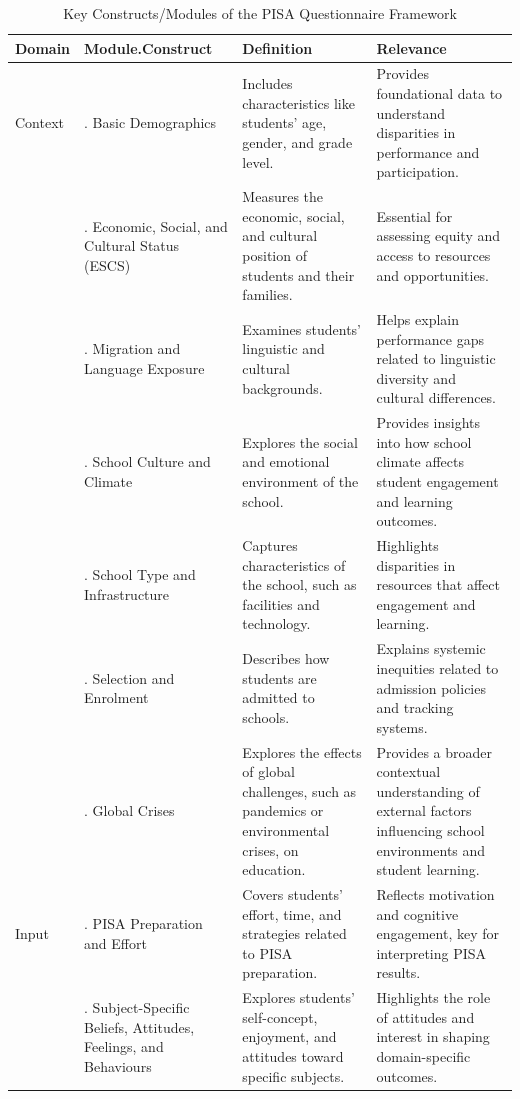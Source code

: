 \documentclass[
]{article}
\begin{document}
\begin{longtable}[l]{>{\raggedright\arraybackslash}p{1.5cm}>{\raggedright\arraybackslash}p{3.5cm}>{\raggedright\arraybackslash}p{5cm}>{\raggedright\arraybackslash}p{5cm}}
\caption{\label{tab:pisa_questionnaire_framework}Key Constructs/Modules of the PISA Questionnaire Framework}\\
\toprule
Domain & Module.Construct & Definition & Relevance\\
\midrule
Context & 1. Basic Demographics & Includes characteristics like students' age, gender, and grade level. & Provides foundational data to understand disparities in performance and participation.\\
 & 2. Economic, Social, and Cultural Status (ESCS) & Measures the economic, social, and cultural position of students and their families. & Essential for assessing equity and access to resources and opportunities.\\
 & 4. Migration and Language Exposure & Examines students' linguistic and cultural backgrounds. & Helps explain performance gaps related to linguistic diversity and cultural differences.\\
 & 6. School Culture and Climate & Explores the social and emotional environment of the school. & Provides insights into how school climate affects student engagement and learning outcomes.\\
 & 11. School Type and Infrastructure & Captures characteristics of the school, such as facilities and technology. & Highlights disparities in resources that affect engagement and learning.\\
\addlinespace
 & 12. Selection and Enrolment & Describes how students are admitted to schools. & Explains systemic inequities related to admission policies and tracking systems.\\
 & 21. Global Crises & Explores the effects of global challenges, such as pandemics or environmental crises, on education. & Provides a broader contextual understanding of external factors influencing school environments and student learning.\\
Input & 5. PISA Preparation and Effort & Covers students’ effort, time, and strategies related to PISA preparation. & Reflects motivation and cognitive engagement, key for interpreting PISA results.\\
 & 7. Subject-Specific Beliefs, Attitudes, Feelings, and Behaviours & Explores students' self-concept, enjoyment, and attitudes toward specific subjects. & Highlights the role of attitudes and interest in shaping domain-specific outcomes.\\

\end{longtable}
\end{document}

